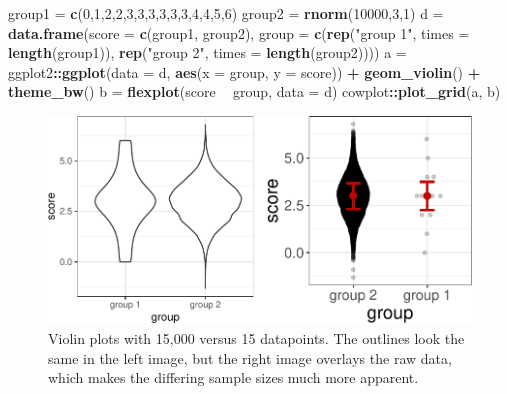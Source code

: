 \documentclass[
  doc]{apa6}
\newenvironment{Shaded}{\begin{snugshade}}{\end{snugshade}}
\newcommand{\DataTypeTok}[1]{\textcolor[rgb]{0.13,0.29,0.53}{#1}}
\newcommand{\DecValTok}[1]{\textcolor[rgb]{0.00,0.00,0.81}{#1}}
\newcommand{\KeywordTok}[1]{\textcolor[rgb]{0.13,0.29,0.53}{\textbf{#1}}}
\newcommand{\NormalTok}[1]{#1}
\newcommand{\OperatorTok}[1]{\textcolor[rgb]{0.81,0.36,0.00}{\textbf{#1}}}
\newcommand{\StringTok}[1]{\textcolor[rgb]{0.31,0.60,0.02}{#1}}
\begin{document}
\begin{Shaded}
\begin{Highlighting}[]
\NormalTok{group1 =}\StringTok{ }\KeywordTok{c}\NormalTok{(}\DecValTok{0}\NormalTok{,}\DecValTok{1}\NormalTok{,}\DecValTok{2}\NormalTok{,}\DecValTok{2}\NormalTok{,}\DecValTok{3}\NormalTok{,}\DecValTok{3}\NormalTok{,}\DecValTok{3}\NormalTok{,}\DecValTok{3}\NormalTok{,}\DecValTok{3}\NormalTok{,}\DecValTok{3}\NormalTok{,}\DecValTok{4}\NormalTok{,}\DecValTok{4}\NormalTok{,}\DecValTok{5}\NormalTok{,}\DecValTok{6}\NormalTok{)}
\NormalTok{group2 =}\StringTok{ }\KeywordTok{rnorm}\NormalTok{(}\DecValTok{10000}\NormalTok{,}\DecValTok{3}\NormalTok{,}\DecValTok{1}\NormalTok{)}
\NormalTok{d =}\StringTok{ }\KeywordTok{data.frame}\NormalTok{(}\DataTypeTok{score =} \KeywordTok{c}\NormalTok{(group1, group2), }
               \DataTypeTok{group =} \KeywordTok{c}\NormalTok{(}\KeywordTok{rep}\NormalTok{(}\StringTok{"group 1"}\NormalTok{, }\DataTypeTok{times =} \KeywordTok{length}\NormalTok{(group1)), }
                       \KeywordTok{rep}\NormalTok{(}\StringTok{"group 2"}\NormalTok{, }\DataTypeTok{times =} \KeywordTok{length}\NormalTok{(group2))))}
\NormalTok{a =}\StringTok{ }\NormalTok{ggplot2}\OperatorTok{::}\KeywordTok{ggplot}\NormalTok{(}\DataTypeTok{data =}\NormalTok{ d, }\KeywordTok{aes}\NormalTok{(}\DataTypeTok{x =}\NormalTok{ group, }\DataTypeTok{y =}\NormalTok{ score)) }\OperatorTok{+}\StringTok{  }
\StringTok{  }\KeywordTok{geom_violin}\NormalTok{() }\OperatorTok{+}\StringTok{ }\KeywordTok{theme_bw}\NormalTok{()}
\NormalTok{b =}\StringTok{ }\KeywordTok{flexplot}\NormalTok{(score }\OperatorTok{~}\StringTok{ }\NormalTok{group, }\DataTypeTok{data =}\NormalTok{ d)}
\NormalTok{cowplot}\OperatorTok{::}\KeywordTok{plot_grid}\NormalTok{(a, b)}
\end{Highlighting}
\end{Shaded}

\begin{figure}

{\centering \includegraphics[width=0.9\linewidth]{flexplot_psychmeth_files/figure-latex/raw-1} 

}

\caption{Violin plots with 15,000 versus 15 datapoints. The outlines look the same in the left image, but the right image overlays the raw data, which makes the differing sample sizes much more apparent. \label{fig:raw}}\label{fig:raw}
\end{figure}
\end{document}
